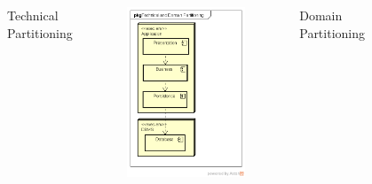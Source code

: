 \documentclass{slide}
\begin{document}
\begin{frame}
    \vspace{4mm}
    \begin{columns}[t]
        \centering
        \LARGE Technical Partitioning
        \begin{figure}
            \centering
            \includegraphics[trim=30 50 142 45,clip,width=0.35\textheight]{diagrams/technical-partitioning.png}
        \end{figure}
        \centering
        \LARGE Domain Partitioning
        \begin{figure}
            \centering

\end{figure}
\end{columns}
\end{frame}
\end{document}
